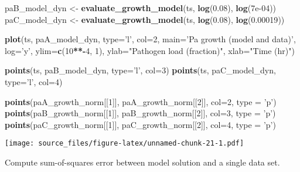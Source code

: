 \documentclass[]{article}
\newenvironment{Shaded}{\begin{snugshade}}{\end{snugshade}}
\newcommand{\KeywordTok}[1]{\textcolor[rgb]{0.13,0.29,0.53}{\textbf{#1}}}
\newcommand{\DataTypeTok}[1]{\textcolor[rgb]{0.13,0.29,0.53}{#1}}
\newcommand{\DecValTok}[1]{\textcolor[rgb]{0.00,0.00,0.81}{#1}}
\newcommand{\FloatTok}[1]{\textcolor[rgb]{0.00,0.00,0.81}{#1}}
\newcommand{\StringTok}[1]{\textcolor[rgb]{0.31,0.60,0.02}{#1}}
\newcommand{\OperatorTok}[1]{\textcolor[rgb]{0.81,0.36,0.00}{\textbf{#1}}}
\newcommand{\NormalTok}[1]{#1}
\begin{document}
\begin{Shaded}
\begin{Highlighting}[]
\NormalTok{paB_model_dyn <-}\StringTok{ }\KeywordTok{evaluate_growth_model}\NormalTok{(ts, }\KeywordTok{log}\NormalTok{(}\FloatTok{0.08}\NormalTok{), }\KeywordTok{log}\NormalTok{(}\FloatTok{7e-04}\NormalTok{))}
\NormalTok{paC_model_dyn <-}\StringTok{ }\KeywordTok{evaluate_growth_model}\NormalTok{(ts, }\KeywordTok{log}\NormalTok{(}\FloatTok{0.08}\NormalTok{), }\KeywordTok{log}\NormalTok{(}\FloatTok{0.00019}\NormalTok{))}

\KeywordTok{plot}\NormalTok{(ts, paA_model_dyn, }\DataTypeTok{type=}\StringTok{'l'}\NormalTok{, }\DataTypeTok{col=}\DecValTok{2}\NormalTok{, }
     \DataTypeTok{main=}\StringTok{'Pa growth (model and data)'}\NormalTok{, }
     \DataTypeTok{log=}\StringTok{'y'}\NormalTok{, }\DataTypeTok{ylim=}\KeywordTok{c}\NormalTok{(}\DecValTok{10}\OperatorTok{**-}\DecValTok{4}\NormalTok{, }\DecValTok{1}\NormalTok{), }
     \DataTypeTok{ylab=}\StringTok{"Pathogen load (fraction)"}\NormalTok{,}
     \DataTypeTok{xlab=}\StringTok{"Time (hr)"}\NormalTok{)}

\KeywordTok{points}\NormalTok{(ts, paB_model_dyn, }\DataTypeTok{type=}\StringTok{'l'}\NormalTok{, }\DataTypeTok{col=}\DecValTok{3}\NormalTok{)}
\KeywordTok{points}\NormalTok{(ts, paC_model_dyn, }\DataTypeTok{type=}\StringTok{'l'}\NormalTok{, }\DataTypeTok{col=}\DecValTok{4}\NormalTok{)}

\KeywordTok{points}\NormalTok{(paA_growth_norm[[}\DecValTok{1}\NormalTok{]], paA_growth_norm[[}\DecValTok{2}\NormalTok{]], }\DataTypeTok{col=}\DecValTok{2}\NormalTok{, }\DataTypeTok{type =} \StringTok{'p'}\NormalTok{)}
\KeywordTok{points}\NormalTok{(paB_growth_norm[[}\DecValTok{1}\NormalTok{]], paB_growth_norm[[}\DecValTok{2}\NormalTok{]], }\DataTypeTok{col=}\DecValTok{3}\NormalTok{, }\DataTypeTok{type =} \StringTok{'p'}\NormalTok{)}
\KeywordTok{points}\NormalTok{(paC_growth_norm[[}\DecValTok{1}\NormalTok{]], paC_growth_norm[[}\DecValTok{2}\NormalTok{]], }\DataTypeTok{col=}\DecValTok{4}\NormalTok{, }\DataTypeTok{type =} \StringTok{'p'}\NormalTok{)}
\end{Highlighting}
\end{Shaded}

\texttt{[image: source\_files/figure-latex/unnamed-chunk-21-1.pdf]}

Compute sum-of-squares error between model solution and a single data
set.
\end{document}
